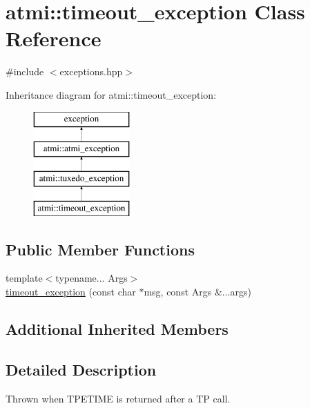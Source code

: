 \hypertarget{classatmi_1_1timeout__exception}{\section{atmi\+:\+:timeout\+\_\+exception Class Reference}
\label{classatmi_1_1timeout__exception}
}


{\ttfamily \#include $<$exceptions.\+hpp$>$}

Inheritance diagram for atmi\+:\+:timeout\+\_\+exception\+:\begin{figure}[H]
\begin{center}
\leavevmode
\includegraphics[height=4.000000cm]{classatmi_1_1timeout__exception}
\end{center}
\end{figure}
\subsection*{Public Member Functions}
\begin{DoxyCompactItemize}
\item 
{\footnotesize template$<$typename... Args$>$ }\\\hyperlink{classatmi_1_1timeout__exception_a8fe65e08189bb4d6cbcd63bbfdb53a2b}{timeout\+\_\+exception} (const char $\ast$msg, const Args \&...args)
\end{DoxyCompactItemize}
\subsection*{Additional Inherited Members}


\subsection{Detailed Description}
Thrown when T\+P\+E\+T\+I\+M\+E is returned after a T\+P call. 

